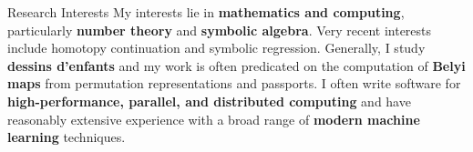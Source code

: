 \begin{rSection}{Research Interests}
My interests lie in \textbf{mathematics and computing}, particularly \textbf{number theory} and \textbf{symbolic algebra}. Very recent interests include homotopy continuation and symbolic regression.
Generally, I study \textbf{dessins d'enfants} and my work is often predicated on the computation of \textbf{Belyi maps} from permutation representations and passports. I often write software for \textbf{high-performance, parallel, and distributed computing} and have reasonably extensive experience with a broad range of \textbf{modern machine learning} techniques.
\end{rSection}